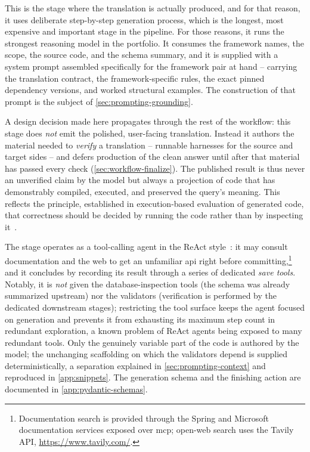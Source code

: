 This is the stage where the translation is actually produced, and for that reason, it uses deliberate step-by-step generation process, which is the longest, most expensive and important stage in the pipeline. For those reasons, it runs the strongest reasoning model in the portfolio. It consumes the framework names, the scope, the source code, and the schema summary, and it is supplied with a system prompt assembled specifically for the framework pair at hand -- carrying the translation contract, the framework-specific rules, the exact pinned dependency versions, and worked structural examples. The construction of that prompt is the subject of \cref{sec:prompting-grounding}.

A design decision made here propagates through the rest of the workflow: this stage does \emph{not} emit the polished, user-facing translation. Instead it authors the material needed to \emph{verify} a translation -- runnable harnesses for the source and target sides -- and defers production of the clean answer until after that material has passed every check (\cref{sec:workflow-finalize}). The published result is thus never an unverified claim by the model but always a projection of code that has demonstrably compiled, executed, and preserved the query's meaning. This reflects the principle, established in execution-based evaluation of generated code, that correctness should be decided by running the code rather than by inspecting it~\cite{chen2021codex,execoder2025}.

The stage operates as a tool-calling agent in the ReAct style~\cite{yaoReActSynergizing2023}: it may consult documentation and the web to get an unfamiliar \acrshort{api} right before committing,\footnote{Documentation search is provided through the Spring and Microsoft documentation services exposed over \acrshort{mcp}; open-web search uses the Tavily API, \url{https://www.tavily.com/}.} and it concludes by recording its result through a series of dedicated \emph{save tools}. Notably, it is \emph{not} given the database-inspection tools (the schema was already summarized upstream) nor the validators (verification is performed by the dedicated downstream stages); restricting the tool surface keeps the agent focused on generation and prevents it from exhausting its maximum step count in redundant exploration, a known problem of ReAct agents being exposed to many redundant tools. Only the genuinely variable part of the code is authored by the model; the unchanging scaffolding on which the validators depend is supplied deterministically, a separation explained in \cref{sec:prompting-context} and reproduced in \cref{app:snippets}. The generation schema and the finishing action are documented in \cref{app:pydantic-schemas}.

